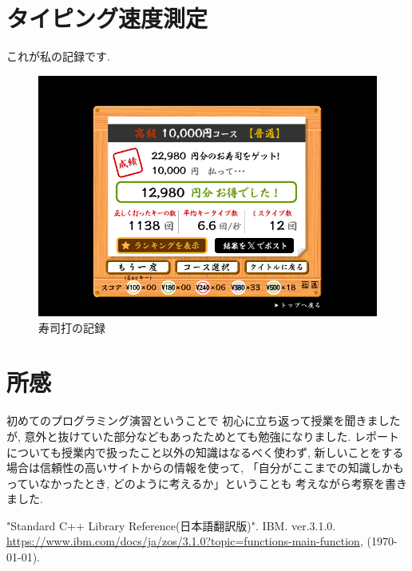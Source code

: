 \documentclass[a4paper, xelatex, ja=standard, 10.5pt]{bxjsarticle}
\begin{document}
\section{タイピング速度測定}
これが私の記録です.

\begin{figure}[H]
\centering
\includegraphics[scale=0.6]{img/sushida.png}

\caption{寿司打の記録}
\label{}
\end{figure}

\section{所感}
初めてのプログラミング演習ということで
初心に立ち返って授業を聞きましたが,
意外と抜けていた部分などもあったためとても勉強になりました.
レポートについても授業内で扱ったこと以外の知識はなるべく使わず,
新しいことをする場合は信頼性の高いサイトからの情報を使って,
「自分がここまでの知識しかもっていなかったとき, どのように考えるか」ということも
考えながら考察を書きました.

\begin{thebibliography}{9} %
  "Standard C++ Library Reference(日本語翻訳版)". IBM. ver.3.1.0. \url{https://www.ibm.com/docs/ja/zos/3.1.0?topic=functions-main-function}, (\today).
\end{thebibliography}
\end{document}
